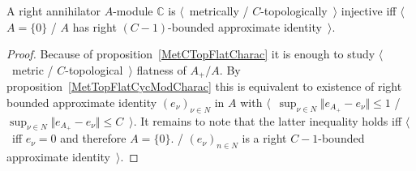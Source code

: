 \begin{proposition}\label{MetTopInjModCCharac} A right annihilator $A$-module
$\mathbb{C}$ is $\langle$~metrically / $C$-topologically~$\rangle$ injective iff
$\langle$~$A= \{0 \}$ / $A$ has right $(C-1)$-bounded approximate
identity~$\rangle$.
\end{proposition}
\begin{proof} Because of proposition~\ref{MetCTopFlatCharac} it is enough 
to study $\langle$~metric / $C$-topological~$\rangle$ flatness of $A_+/A$. By
proposition~\ref{MetTopFlatCycModCharac} this is equivalent to existence of
right bounded approximate identity ${(e_\nu)}_{\nu\in N}$ in $A$ with
$\langle$~$\sup_{\nu\in N}\Vert e_{A_+}-e_\nu\Vert\leq 1$ / 
$\sup_{\nu\in N}\Vert e_{A_+}-e_\nu\Vert\leq C$~$\rangle$. 
It remains to note that the latter inequality holds 
iff $\langle$~iff $e_\nu=0$ and therefore $A= \{0 \}$. /
${(e_\nu)}_{n\in N}$ is a right $C-1$-bounded approximate identity~$\rangle$.
\end{proof}

